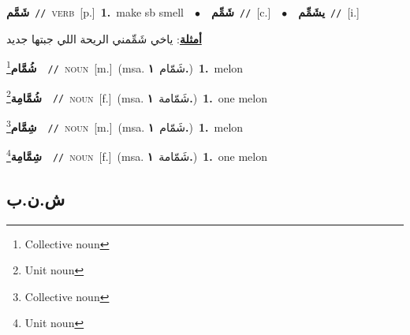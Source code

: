 \documentclass[10pt,a4paper,twoside]{article} %
\begin{document}
\begin{multicols}{2}
{\setlength\topsep{0pt}\textbf{\foreignlanguage{arabic}{شَمَّم}}\ {\color{gray}\texttt{//}\color{black}}\ \textsc{verb}\ [p.]\ \textbf{1.}~make sb smell\ \ $\bullet$\ \ \setlength\topsep{0pt}\textbf{\foreignlanguage{arabic}{شَمِّم}}\ {\color{gray}\texttt{//}\color{black}}\ [c.]\ \ $\bullet$\ \ \setlength\topsep{0pt}\textbf{\foreignlanguage{arabic}{يشَمِّم}}\ {\color{gray}\texttt{//}\color{black}}\ [i.]\  \begin{flushright}\color{gray}\foreignlanguage{arabic}{\textbf{\underline{\foreignlanguage{arabic}{أمثلة}}}: ياخي شَمِّمني الريحة اللي جبتها جديد}\end{flushright}\color{black}} \vspace{2mm}

{\setlength\topsep{0pt}\textbf{\foreignlanguage{arabic}{شُمَّام}}\footnote{Collective noun}\ \ {\color{gray}\texttt{//}\color{black}}\ \textsc{noun}\ [m.]\ \color{gray}(msa. \foreignlanguage{arabic}{شَمّام}~\foreignlanguage{arabic}{\textbf{١.}})\color{black}\ \textbf{1.}~melon\ } \vspace{2mm}

{\setlength\topsep{0pt}\textbf{\foreignlanguage{arabic}{شُمَّامِة}}\footnote{Unit noun}\ \ {\color{gray}\texttt{//}\color{black}}\ \textsc{noun}\ [f.]\ \color{gray}(msa. \foreignlanguage{arabic}{شَمّامة}~\foreignlanguage{arabic}{\textbf{١.}})\color{black}\ \textbf{1.}~one melon\ } \vspace{2mm}

{\setlength\topsep{0pt}\textbf{\foreignlanguage{arabic}{شِمَّام}}\footnote{Collective noun}\ \ {\color{gray}\texttt{//}\color{black}}\ \textsc{noun}\ [m.]\ \color{gray}(msa. \foreignlanguage{arabic}{شَمّام}~\foreignlanguage{arabic}{\textbf{١.}})\color{black}\ \textbf{1.}~melon\ } \vspace{2mm}

{\setlength\topsep{0pt}\textbf{\foreignlanguage{arabic}{شِمَّامِة}}\footnote{Unit noun}\ \ {\color{gray}\texttt{//}\color{black}}\ \textsc{noun}\ [f.]\ \color{gray}(msa. \foreignlanguage{arabic}{شَمّامة}~\foreignlanguage{arabic}{\textbf{١.}})\color{black}\ \textbf{1.}~one melon\ } \vspace{2mm}

\vspace{-3mm}
\subsection*{\color{blue}\foreignlanguage{arabic}{ش.ن.ب}\color{blue}{}} 


\end{multicols}
\end{document}
